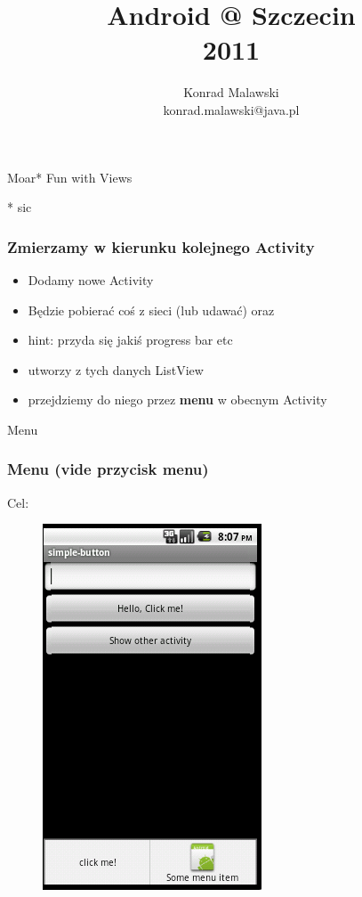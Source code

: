 \documentclass{beamer}
\title{Android @ Szczecin \\ 2011}
\author{Konrad Malawski \\ konrad.malawski@java.pl}
\begin{document}
\begin{frame}
 \begin{center}
  \Huge{Moar* Fun with Views}
 \end{center}
\begin{flushright}
* sic
\end{flushright}
\end{frame}


\begin{frame}\frametitle{Zmierzamy w kierunku kolejnego Activity}
\begin{itemize}
 \item Dodamy nowe Activity
 \pause \item Będzie pobierać coś z sieci (lub udawać) oraz
 \pause \item hint: przyda się jakiś progress bar etc
 \pause \item utworzy z tych danych ListView
 \pause \item przejdziemy do niego przez \textbf{menu} w obecnym Activity
\end{itemize}
\end{frame}

\begin{frame}
\begin{center}
 \Huge{Menu}
\end{center}
\end{frame}


\begin{frame}\frametitle{Menu (vide przycisk menu)}
\begin{center}
 Cel:\\
 \begin{figure}
  \includegraphics[height=.75\textheight]{images/sample_with_menu}
 \end{figure}
\end{center}
\end{frame}
\end{document}
